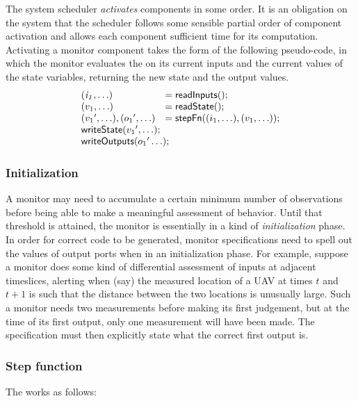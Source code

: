 The system scheduler \emph{activates} components in some order. It is
an obligation on the system that the scheduler follows some sensible
partial order of component activation and allows each component
sufficient time for its computation.  Activating a monitor component
takes the form of the following pseudo-code, in which the monitor
evaluates the  on its current inputs and the current
values of the state variables, returning the new state and the output
values.
\[
\begin{array}{ll}
 \mathit{(i_1,\ldots)} & = \konst{readInputs}(); \\
 (v_1,\ldots) & = \konst{readState}() ; \\
 ({v_1}',\ldots), ({o_1}',\ldots) & = \konst{stepFn} ((i_1,\ldots),(v_1,\ldots)) ; \\
 \multicolumn{2}{l}{\konst{writeState}({v_1}',\ldots);} \\
 \multicolumn{2}{l}{\konst{writeOutputs}({o_1}'\ldots);} \\
\end{array}
\]

\subsubsection{Initialization}

A monitor may need to accumulate a certain minimum number of
observations before being able to make a meaningful assessment of
behavior. Until that threshold is attained, the monitor is essentially
in a kind of \emph{initialization} phase. In order for correct code to
be generated, monitor specifications need to spell out the values of
output ports when in an initialization phase. For example, suppose a
monitor does some kind of differential assessment of inputs at
adjacent timeslices, alerting when (say) the measured location of a
UAV at times $t$ and $t+1$ is such that the distance between the two
locations is unusually large. Such a monitor needs two measurements
before making its first judgement, but at the time of its first
output, only one measurement will have been made. The specification
must then explicitly state what the correct first output is.

\subsubsection{Step function}

The  works as follows:

